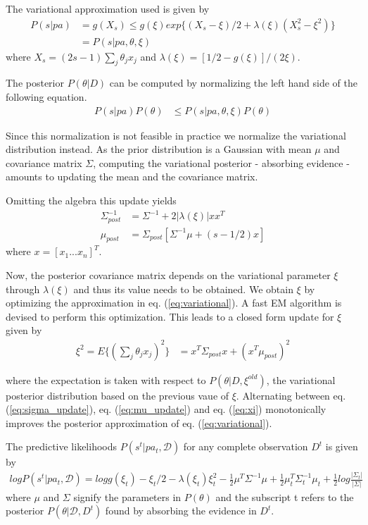 The variational approximation used is given by
\begin{align}
  P(s|pa) &= g(X_s) \leq g(\xi)exp\{(X_s - \xi)/2 + \lambda(\xi)(X_s^2 - \xi^2)\}\\
  &= P(s|pa, \theta, \xi)
\end{align}
where $X_s = (2s - 1)\sum_j\theta_jx_j$ and $\lambda(\xi) = [1/2 - g(\xi)]/(2\xi)$.

The posterior $P(\theta|D)$ can be computed by normalizing the left hand side of the following equation.
\begin{align}
\label{eq:variational}
P(s|pa)P(\theta) &\leq P(s|pa, \theta, \xi)P(\theta)
\end{align}

Since this normalization is not feasible in practice we normalize the variational distribution instead. As the prior distribution is a Gaussian with mean $\mu$ and covariance matrix $\Sigma$, computing the variational posterior - absorbing evidence - amounts to updating the mean and the covariance matrix. 

Omitting the algebra this update yields 
\begin{align}
\label{eq:sigma_update}
\Sigma^{-1}_{post} &= \Sigma^{-1} + 2|\lambda(\xi)|xx^T\\
\label{eq:mu_update}
\mu_{post} &= \Sigma_{post}[\Sigma^{-1}\mu + (s - 1/2)x]
\end{align}
where $x = [x_1 ...x_n]^T$. 

Now, the posterior covariance matrix depends on the variational parameter $\xi$ through $\lambda(\xi)$ and thus its value needs to be obtained. We obtain $\xi$ by optimizing the approximation in eq. (\ref{eq:variational}). A fast EM algorithm is devised to perform this optimization. This leads to a closed form update for $\xi$ given by 
\begin{align}
\label{eq:xi}
\xi^2 = E\{(\sum_j\theta_jx_j)^2\} &= x^T\Sigma_{post}x + (x^T\mu_{post})^2
\end{align}

where the expectation is taken with respect to $P(\theta|D, \xi^{old})$, the variational posterior distribution based on the previous vaue of $\xi$. Alternating between eq. (\ref{eq:sigma_update}), eq. (\ref{eq:mu_update}) and eq. (\ref{eq:xi}) monotonically improves the posterior approximation of eq. (\ref{eq:variational}).

The predictive likelihoods $P(s^t | pa_t, \mathcal{D})$ for any complete observation $D^t$ is given by
\begin{align}
  logP(s^t|pa_t, \mathcal{D}) = logg(\xi_t) - \xi_t/2 - \lambda(\xi_t)\xi_t^2 - \frac{1}{2}\mu^T\Sigma^{-1}\mu + \frac{1}{2}\mu^T_t\Sigma^{-1}_t\mu_t + \frac{1}{2}log\frac{|\Sigma_t|}{|\Sigma|}
\end{align}
where $\mu$ and $\Sigma$ signify the parameters in $P(\theta)$ and the subscript t refers to the posterior $P(\theta|\mathcal{D}, D^t)$ found by absorbing the evidence in $D^t$.

